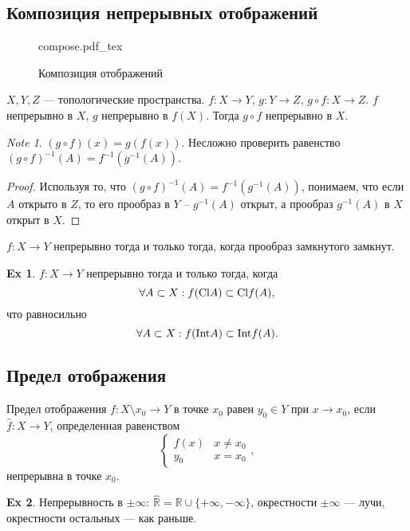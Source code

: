 \documentclass[11pt]{book}
\newcommand{\incfig}[1]{%
    \def\svgwidth{\columnwidth}
    {#1.pdf_tex}
}
\newcommand{\R}{\mathbb{R}}
\newcommand{\Cl}{{\mathop{\text{\rm Cl}}}}
\newcommand{\Int}{{\mathop{\text{\rm Int}}}}
\theoremstyle{definition}
\theoremstyle{plain}
\theoremstyle{plain}
\theoremstyle{definition}
\newtheorem*{ex}{Ex}
\theoremstyle{remark}
\newtheorem*{note}{Note}
\begin{document}
\subsection{Композиция непрерывных отображений}
\begin{figure}[ht]
    \centering
    \incfig{compose}
    \caption{Композиция отображений}
    \label{fig:compose}
\end{figure}
\begin{thm}
    $ X, Y, Z$ --- топологические пространства. $ f: X \to  Y$, $ g: Y \to Z $, $ g \circ f: X \to  Z$.
    $ f$ непрерывно в $ X$,  $ g$ непрерывно в $ f(X)$. Тогда $ g \circ f $ непрерывно в $ X$.
    \begin{note}
	$ (g \circ f)(x) = g(f(x))$. Несложно проверить равенство $ (g \circ f)^{-1}(A) = f^{-1}(g^{-1}(A))$.   
    \end{note}
\end{thm}
\begin{proof}
    Используя то, что $ (g\circ f)^{-1}(A) = f^{-1}(g^{-1}(A))$, понимаем, что если $ A$ открыто в  $ Z$, то его прообраз в $ Y$ -- $ g^{-1}(A)$ открыт, а прообраз $ g^{-1}(A)$ в $ X$ открыт в  $ X$.
\end{proof}
\begin{thm}
    $ f: X \to  Y$ непрерывно тогда и только тогда, когда прообраз замкнутого замкнут.
\end{thm}
\begin{ex}
    $ f: X \to  Y$ непрерывно тогда и только тогда, когда 
    \[
	\forall A \subset X: f(\Cl A) \subset \Cl f(A) 
    ,\] 
    что равносильно
    \[
	\forall A \subset X: f(\Int A) \subset \Int f(A) 
    .\] 
\end{ex}

\subsection{Предел отображения}
\begin{defn}
    Предел отображения $ f: X\setminus {x_0} \to  Y $ в точке $ x_0$ равен $ y_0 \in Y$ при $ x \to  x_0$, если $ \hat{f}: X \to  Y$, определенная равенством \[
    \begin{cases}
	f(x) & x \ne x_0 \\
	y_0 & x = x_0
    \end{cases}
    ,\] 
    непрерывна в точке $ x_0$.
\end{defn}
\begin{ex}
    Непрерывность в $ \pm \infty$: $ \hat{\R} = \R \cup \{+ \infty, -\infty\}$, окрестности $ \pm \infty$ --- лучи, окрестности остальных --- как раньше.
\end{ex}
\end{document}
